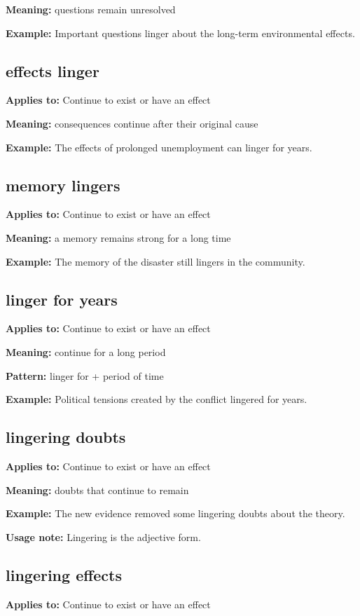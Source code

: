 \documentclass[11pt]{article}
\begin{document}
\textbf{Meaning:} questions remain unresolved

\textbf{Example:} Important questions linger about the long-term environmental effects.

\subsection{effects linger}
\textbf{Applies to:} Continue to exist or have an effect

\textbf{Meaning:} consequences continue after their original cause

\textbf{Example:} The effects of prolonged unemployment can linger for years.

\subsection{memory lingers}
\textbf{Applies to:} Continue to exist or have an effect

\textbf{Meaning:} a memory remains strong for a long time

\textbf{Example:} The memory of the disaster still lingers in the community.

\subsection{linger for years}
\textbf{Applies to:} Continue to exist or have an effect

\textbf{Meaning:} continue for a long period

\textbf{Pattern:} linger for + period of time

\textbf{Example:} Political tensions created by the conflict lingered for years.

\subsection{lingering doubts}
\textbf{Applies to:} Continue to exist or have an effect

\textbf{Meaning:} doubts that continue to remain

\textbf{Example:} The new evidence removed some lingering doubts about the theory.

\textbf{Usage note:} Lingering is the adjective form.

\subsection{lingering effects}
\textbf{Applies to:} Continue to exist or have an effect
\end{document}
